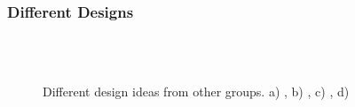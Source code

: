 \documentclass[serif,8pt]{beamer}
\begin{document}
{{\begin{frame}[t]
	\frametitle{Different Designs}
	\begin{figure}[!ht]
	  \centering
	  \caption{Different design ideas from other groups. a) \cite{design1}, b) \cite{design2}, c) \cite{design3}, d) \cite{design4}}
	  \quad
	  \\
	  \quad
	  \\
	  \label{fig:sub4}
	\end{figure}
\end{frame}


}}
\end{document}
